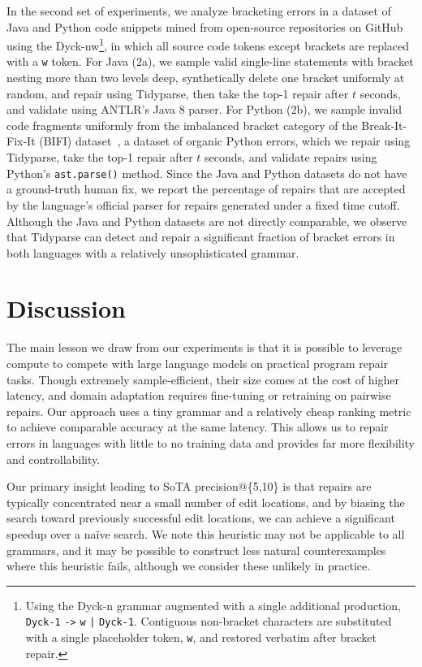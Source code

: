 \documentclass[sigplan,review,anonymous,acmsmall]{acmart}\settopmatter{printfolios=false,printccs=false,printacmref=false}
\begin{document}
In the second set of experiments, we analyze bracketing errors in a dataset of Java and Python code snippets mined from open-source repositories on GitHub using the Dyck-nw\footnote{Using the Dyck-n grammar augmented with a single additional production, \texttt{Dyck-1} {\color{blue}\texttt{->}} \texttt{w} {\color{blue}\texttt{|}} \texttt{Dyck-1}. Contiguous non-bracket characters are substituted with a single placeholder token, \texttt{w}, and restored verbatim after bracket repair.}, in which all source code tokens except brackets are replaced with a \texttt{w} token. For Java (2a), we sample valid single-line statements with bracket nesting more than two levels deep, synthetically delete one bracket uniformly at random, and repair using Tidyparse, then take the top-1 repair after $t$ seconds, and validate using ANTLR's Java 8 parser. For Python (2b), we sample invalid code fragments uniformly from the imbalanced bracket category of the Break-It-Fix-It (BIFI) dataset~\cite{yasunaga2021break}, a dataset of organic Python errors, which we repair using Tidyparse, take the top-1 repair after $t$ seconds, and validate repairs using Python's \texttt{ast.parse()} method. Since the Java and Python datasets do not have a ground-truth human fix, we report the percentage of repairs that are accepted by the language's official parser for repairs generated under a fixed time cutoff. Although the Java and Python datasets are not directly comparable, we observe that Tidyparse can detect and repair a significant fraction of bracket errors in both languages with a relatively unsophisticated grammar.

\section{Discussion}\label{sec:discussion}

The main lesson we draw from our experiments is that it is possible to leverage compute to compete with large language models on practical program repair tasks. Though extremely sample-efficient, their size comes at the cost of higher latency, and domain adaptation requires fine-tuning or retraining on pairwise repairs. Our approach uses a tiny grammar and a relatively cheap ranking metric to achieve comparable accuracy at the same latency. This allows us to repair errors in languages with little to no training data and provides far more flexibility and controllability.

Our primary insight leading to SoTA precision@\{5,10\} is that repairs are typically concentrated near a small number of edit locations, and by biasing the search toward previously successful edit locations, we can achieve a significant speedup over a na\"ive search. We note this heuristic may not be applicable to all grammars, and it may be possible to construct less natural counterexamples where this heuristic fails, although we consider these unlikely in practice.
\end{document}
